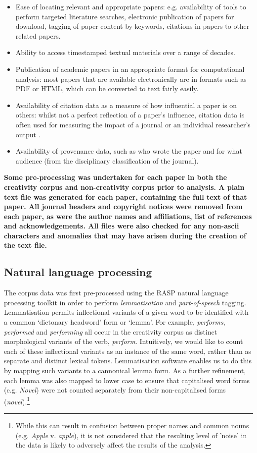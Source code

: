 \documentclass[10pt,letterpaper]{article}
\begin{document}
\begin{itemize}
\item Ease of locating relevant and appropriate papers: e.g. availability of tools to perform targeted literature searches, electronic publication of papers for download, tagging of paper content by keywords, citations in papers to other related papers.
\item Ability to access timestamped textual materials over a range of decades.
\item Publication of academic papers in an appropriate format for computational analysis: most papers that are available electronically are in formats such as PDF or HTML, which can be converted to text fairly easily.
\item Availability of citation data as a measure of how influential a paper is on others: whilst not a perfect reflection of a paper's influence, citation data is often used for measuring the impact of a journal \cite{garfield72} or an individual researcher's output \cite{hirsch05}.
\item Availability of provenance data, such as who wrote the paper and for what audience (from the disciplinary classification of the journal).
\end{itemize}
\noindent 

\textbf{Some pre-processing was undertaken for each paper in both the creativity corpus and non-creativity corpus prior to analysis. A plain text file was generated for each paper, containing the full text of that paper. All journal headers and copyright notices were removed from each paper, as were the author names and affiliations, list of references and acknowledgements. All files were also checked for any non-ascii characters and anomalies that may have arisen during the creation of the text file.}

\subsection*{Natural language processing}

The corpus data was first pre-processed using the RASP natural language processing toolkit \cite{briscoe06} in order to perform {\em lemmatisation} and {\em part-of-speech} tagging.  Lemmatisation permits inflectional variants of a given word to be identified with a common `dictonary headword' form or `lemma'.  For example,  {\em performs\/}, {\em performed\/}  and {\em performing\/} all occur in the creativity corpus as distinct morphological variants of  the  verb, {\em perform\/}.  Intuitively, we would like to count each of these inflectional variants as an instance of the same word, rather than as separate and distinct lexical tokens. Lemmatisation software enables us to do this by mapping such variants to a cannonical lemma form. As a further refinement, each lemma was also mapped to lower case to ensure that capitalised word forms (e.g. {\em Novel\/}) were not counted separately from their non-capitalised forms ({\em novel\/}).\footnote{While this can result in confusion between proper names and common nouns (e.g. {\em Apple\/} v. {\em apple\/}), it is not considered that the resulting level of 'noise'  in the data is likely to adversely affect the results of the analysis.}
\end{document}
